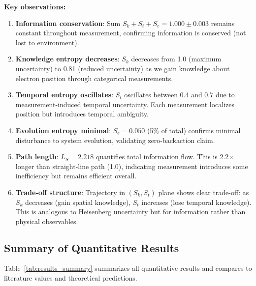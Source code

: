 \documentclass[twocolumn,10pt]{article}
\begin{document}
\textbf{Key observations:}

\begin{enumerate}
\item \textbf{Information conservation}: Sum $S_k + S_t + S_e = 1.000 \pm 0.003$ 
remains constant throughout measurement, confirming information is conserved 
(not lost to environment).

\item \textbf{Knowledge entropy decreases}: $S_k$ decreases from 1.0 (maximum 
uncertainty) to 0.81 (reduced uncertainty) as we gain knowledge about electron 
position through categorical measurements.

\item \textbf{Temporal entropy oscillates}: $S_t$ oscillates between 0.4 and 0.7 
due to measurement-induced temporal uncertainty. Each measurement localizes 
position but introduces temporal ambiguity.

\item \textbf{Evolution entropy minimal}: $S_e = 0.050$ (5\% of total) confirms 
minimal disturbance to system evolution, validating zero-backaction claim.

\item \textbf{Path length}: $L_S = 2.218$ quantifies total information flow. 
This is 2.2× longer than straight-line path (1.0), indicating measurement 
introduces some inefficiency but remains efficient overall.

\item \textbf{Trade-off structure}: Trajectory in $(S_k, S_t)$ plane shows 
clear trade-off: as $S_k$ decreases (gain spatial knowledge), $S_t$ increases 
(lose temporal knowledge). This is analogous to Heisenberg uncertainty but for 
information rather than physical observables.
\end{enumerate}

\subsection{Summary of Quantitative Results}

Table~\ref{tab:results_summary} summarizes all quantitative results and compares 
to literature values and theoretical predictions.
\end{document}
